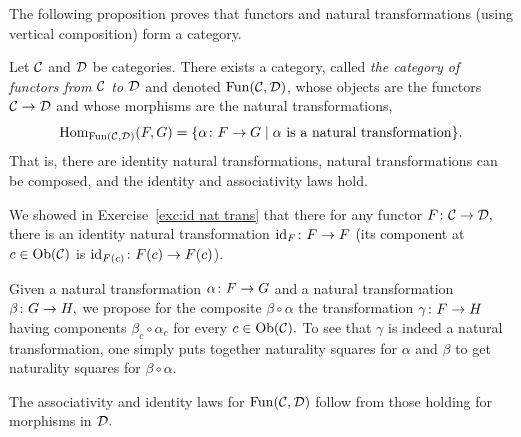 \documentclass[CT4S-EN-RU]{subfiles}
\begin{document}
\begin{blockRUS}
\end{blockRUS}


\subsubsection{}

\begin{blockENG}
The following proposition proves that functors and natural transformations (using vertical composition) form a category.
\end{blockENG}

\begin{blockRUS}
\end{blockRUS}

\begin{propositionENG}\label{prop:Fun(C,D)}
Let $\mathcal{C}$ and $\mathcal{D}$ be categories. There exists a category, called {\em the category of functors from $\mathcal{C}$ to $\mathcal{D}$} and denoted $\textnormal{Fun}(\mathcal{C},\mathcal{D})$, whose objects are the functors $\mathcal{C}\rightarrow\mathcal{D}$ and whose morphisms are the natural transformations,
$$\textnormal{Hom}_{\textnormal{Fun}(\mathcal{C},\mathcal{D})}(F,G)=\{\alpha\colon F\rightarrow G{\;|\;}\alpha\textnormal{ is a natural transformation}\}.$$That is, there are identity natural transformations, natural transformations can be composed, and the identity and associativity laws hold.
\end{propositionENG}

\begin{propositionRUS}\label{prop:Fun(C,D)}
\end{propositionRUS}

\begin{proofENG}
We showed in Exercise~\ref{exc:id nat trans} that there for any functor $F\colon\mathcal{C}\rightarrow\mathcal{D},$ there is an identity natural transformation $\textnormal{id}_F\colon F\rightarrow F$ (its component at $c\in\textnormal{Ob}(\mathcal{C})$ is $\textnormal{id}_{F(c)}\colon F(c)\rightarrow F(c)$). 

Given a natural transformation $\alpha\colon F\rightarrow G$ and a natural transformation $\beta\colon G\rightarrow H,$ we propose for the composite $\beta\circ\alpha$ the transformation $\gamma\colon F\rightarrow H$ having components $\beta_c\circ\alpha_c$ for every $c\in\textnormal{Ob}(\mathcal{C}).$ To see that $\gamma$ is indeed a natural transformation, one simply puts together naturality squares for $\alpha$ and $\beta$ to get naturality squares for $\beta\circ\alpha.$ 

The associativity and identity laws for $\textnormal{Fun}(\mathcal{C},\mathcal{D})$ follow from those holding for morphisms in $\mathcal{D}.$
\end{proofENG}
\end{document}
